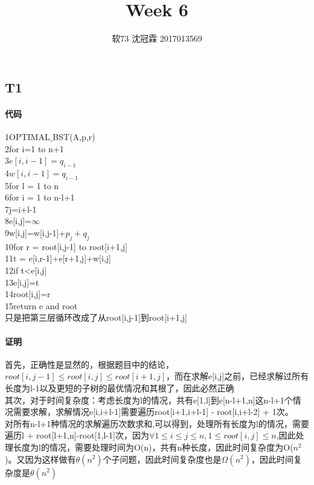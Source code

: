 \documentclass{article}
\title{Week 6}
\author{软73 沈冠霖 2017013569}
\begin{document}
\begin{CJK}{UTF8}{gkai}
\maketitle
\section{T1}
\paragraph{代码}
1\qquad OPTIMAL$\_$BST(A,p,r)\\
2\qquad for i=1 to n+1\\
3\qquad \qquad $e[i,i-1]=q_{i-1}$\\
4\qquad \qquad $w[i,i-1]=q_{i-1}$\\
5\qquad for l = 1 to  n\\
6\qquad\qquad for i = 1 to n-l+1\\
7\qquad\qquad\qquad  j=i+l-1\\
8\qquad\qquad\qquad e[i,j]=$\infty$\\
9\qquad\qquad\qquad w[i,j]=w[i,j-1]+$p_{j}+q_{j}$\\
10\qquad\qquad\qquad for r = root[i,j-1] to root[i+1,j]\\
11\qquad\qquad\qquad\qquad t = e[i,r-1]+e[r+1,j]+w[i,j]\\
12\qquad\qquad\qquad\qquad if t<e[i,j]\\
13\qquad\qquad\qquad\qquad\qquad e[i,j]=t\\
14\qquad\qquad\qquad\qquad\qquad root[i,j]=r\\
15\qquad return e and root\\
只是把第三层循环改成了从root[i,j-1]到root[i+1,j]
\paragraph{证明}
首先，正确性是显然的，根据题目中的结论，$root[i,j-1] \leq root[i,j] \leq root[i+1,j]$，而在求解e[i,j]之前，已经求解过所有长度为l-1以及更短的子树的最优情况和其根了，因此必然正确\\
其次，对于时间复杂度：考虑长度为l的情况，共有e[1,l]到e[n-l+1,n]这n-l+1个情况需要求解，求解情况e[i,i+l-1]需要遍历root[i+1,i+l-1] - root[i,i+l-2] + 1次。\\
对所有n-l+1种情况的求解遍历次数求和,可以得到，处理所有长度为l的情况，需要遍历l + root[l+1,n]-root[1,l-1]次，因为$\forall 1\leq i \leq j\leq n, 1\leq root[i,j] \leq n$,因此处理长度为l的情况，需要处理时间为O(n)，共有n种长度，因此时间复杂度为O($n^{2}$)。又因为这样做有$\theta (n^{2})$个子问题，因此时间复杂度也是$\Omega (n^{2})$，因此时间复杂度是$\theta(n^{2})$


\end{CJK}
\end{document}
